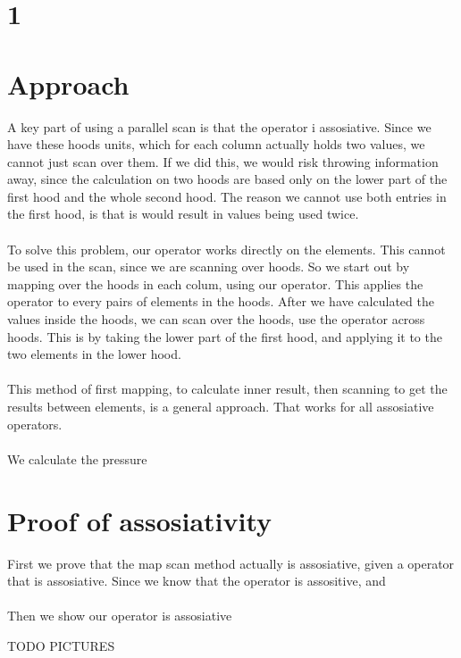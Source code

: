 \documentclass[11pt]{report}
\begin{document}
\pagestyle{fancy}
\setlength{\parindent}{0pt}


\section{1}


\section{Approach}
A key part of using a parallel scan is that the operator i assosiative. Since we have these hoods units, which for each column actually holds two values, we cannot just scan over them. If we did this, we would risk throwing information away, since the calculation on two hoods are based only on the lower part of the first hood and the whole second hood. The reason we cannot use both entries in the first hood, is that is would result in values being used twice.
\\
\\
To solve this problem, our operator works directly on the elements. This cannot be used in the scan, since we are scanning over hoods. So we start out by mapping over the hoods in each colum, using our operator. This applies the operator to every pairs of elements in the hoods. After we have calculated the values inside the hoods, we can scan over the hoods, use the operator across hoods. This is by taking the lower part of the first hood, and applying it to the two elements in the lower hood.
\\
\\
This method of first mapping, to calculate inner result, then scanning to get the results between elements, is a general approach. That works for all assosiative operators.
\\
\\
We calculate the pressure

\section{Proof of assosiativity}

First we prove that the map scan method actually is assosiative, given a operator that is assosiative. Since we know that the operator is assositive, and
\\
\\
Then we show our operator is assosiative

TODO PICTURES
\end{document}
